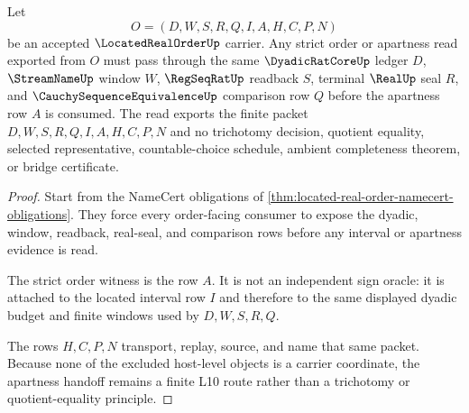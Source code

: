 \begin{theorem}
\label{thm:located-real-order-apartness-handoff}
Let
$$
O=(D,W,S,R,Q,I,A,H,C,P,N)
$$
be an accepted $\LocatedRealOrderUp$ carrier. Any strict order or apartness read exported from $O$ must pass through the same $\DyadicRatCoreUp$ ledger $D$, $\StreamNameUp$ window $W$, $\RegSeqRatUp$ readback $S$, terminal $\RealUp$ seal $R$, and $\CauchySequenceEquivalenceUp$ comparison row $Q$ before the apartness row $A$ is consumed. The read exports the finite packet $D,W,S,R,Q,I,A,H,C,P,N$ and no trichotomy decision, quotient equality, selected representative, countable-choice schedule, ambient completeness theorem, or bridge certificate.
\end{theorem}
\begin{proof}
Start from the NameCert obligations of \autoref{thm:located-real-order-namecert-obligations}. They force every order-facing consumer to expose the dyadic, window, readback, real-seal, and comparison rows before any interval or apartness evidence is read.

The strict order witness is the row $A$. It is not an independent sign oracle: it is attached to the located interval row $I$ and therefore to the same displayed dyadic budget and finite windows used by $D,W,S,R,Q$.

The rows $H,C,P,N$ transport, replay, source, and name that same packet. Because none of the excluded host-level objects is a carrier coordinate, the apartness handoff remains a finite L10 route rather than a trichotomy or quotient-equality principle.
\end{proof}

